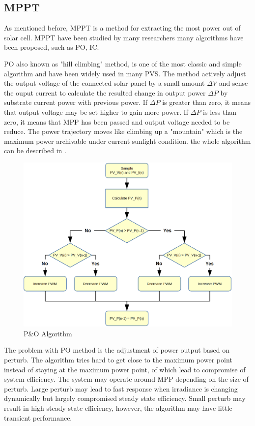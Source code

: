 \subsection{MPPT}
As mentioned before, \gls{MPPT} is a method for extracting the most power out of solar cell. \gls{MPPT} have been studied by many researchers many algorithms have been proposed, such as \gls{PO}, \gls{IC}\cite{RN16}\cite{RN34}\cite{RN28}\cite{RN12}\cite{RN18}. \

\gls{PO} also known as "hill climbing" method, is one of the most classic and simple algorithm and have been widely used in many \gls{PVS}. The method actively adjust the output voltage of the connected solar panel by a small amount $\Delta V$ and sense the ouput current to calculate the resulted change in output power $\Delta P$ by substrate current power with previous power. If $\Delta P$ is greater than zero, it means that output voltage may be set higher to gain more power. If $\Delta P$ is less than zero, it means that MPP has been passed and output voltage needed to be reduce. The power trajectory moves like climbing up a "mountain" which is the maximum power archivable under current sunlight condition. the whole algorithm can be described in .
\begin{figure}[!b]
\centering
    \includegraphics[width = 1\textwidth]{figures/pando.png}
    \caption{P\&O Algorithm}
    \label{fig:hill_climb}	
\end{figure}

The problem with \gls{PO} method is the adjustment of power output based on perturb. The algorithm tries hard to get close to the maximum power point instead of staying at the maximum power point, of which lead to compromise of system efficiency. The system may operate around MPP depending on the size of perturb. Large perturb may lead to fast response when irradiance is changing dynamically but largely compromised steady state efficiency. Small perturb may result in high steady state efficiency, however, the algorithm may have little transient performance. 

